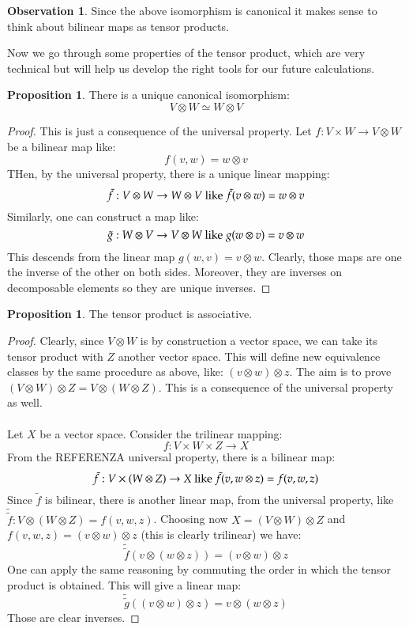 \documentclass[12pt,a4paper]{report}
\theoremstyle{definition}
\theoremstyle{Theorem}
\newtheorem{Prop}[Def]{Proposition}
\theoremstyle{break}
\theoremstyle{definition}
\newtheorem{Obs}[Def]{Observation}
\begin{document}
	\begin{Obs}\label{obs_1.1.2}
		Since the above isomorphism is canonical it makes sense to think about bilinear maps as tensor products. 
	\end{Obs}
	Now we go through some properties of the tensor product, which are very technical but will help us develop the right tools for our future calculations.
	\begin{Prop}\label{prop_1.1.2}
		There is a unique canonical isomorphism: 
		$$V\otimes W\simeq W\otimes V$$
	\end{Prop}
	\begin{proof}
		This is just a consequence of the universal property. Let $f:V\times W\rightarrow V\otimes W$ be a bilinear map like:
		$$f(v,w)=w\otimes v$$
		THen, by the universal property, there is a unique linear mapping:
		$$\tilde{f}:V\otimes W\rightarrow W\otimes V\hbox{ like }\tilde{f}(v\otimes w)=w\otimes v$$
		Similarly, one can construct a map like: 
		$$\tilde{g}:W\otimes V\rightarrow V\otimes W\hbox{ like }g(w\otimes v)=v\otimes w$$
		This descends from the linear map $g(w,v)=v\otimes w$. Clearly, those maps are one the inverse of the other on both sides. Moreover, they are inverses on decomposable elements so they are unique inverses.
	\end{proof}
	\begin{Prop}\label{prop_1.1.3}
		The tensor product is associative.
	\end{Prop}
	\begin{proof}
		Clearly, since $V\otimes W$ is by construction a vector space, we can take its tensor product with $Z$ another vector space. This will define new equivalence classes by the same procedure as above, like: $(v\otimes w)\otimes z$. The aim is to prove $(V\otimes W)\otimes Z=V\otimes (W\otimes Z)$. This is a consequence of the universal property as well.\\
		\\
		Let $X$ be a vector space. Consider the trilinear mapping:
		$$f:V\times W\times Z\rightarrow X$$
		From the REFERENZA universal property, there is a bilinear map: 
		$$\tilde{f}:V\times (W\otimes Z)\rightarrow X\hbox{ like }\tilde{f}(v,w\otimes z)=f(v,w,z)$$
		Since $\tilde{f}$ is bilinear, there is another linear map, from the universal property, like $\tilde{\tilde f}:V\otimes(W\otimes Z)=f(v,w,z)$. Choosing now $X=(V\otimes W)\otimes Z$ and $f(v,w,z)=(v\otimes w)\otimes z$ (this is clearly trilinear) we have:
		$$\tilde{\tilde f}(v\otimes (w\otimes z))=(v\otimes w)\otimes z$$
		One can apply the same reasoning by commuting the order in which the tensor product is obtained. This will give a linear map:
		$$\tilde{\tilde g}((v\otimes w)\otimes z)=v\otimes (w\otimes z)$$
		Those are clear inverses.
	\end{proof}
\end{document}
